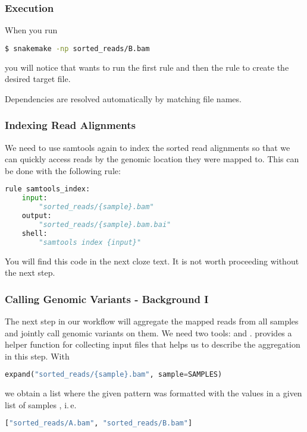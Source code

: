 \begin{frame}[fragile]
  \frametitle{Execution}
  When you run 
  \begin{lstlisting}[language=Bash, style=Shell]
$ snakemake -np sorted_reads/B.bam
  \end{lstlisting}
  you will notice that \Snakemake{} wants to run the first rule  and then the rule  to create the desired target file.
  \begin{docs}
  	Dependencies are resolved automatically by matching file names.
  \end{docs}
\end{frame}

\begin{frame}[fragile]
  \frametitle{Indexing Read Alignments}
  We need to use samtools again to index the sorted read alignments so that we can quickly access reads by the genomic location they were mapped to. This can be done with the following rule:
  \begin{lstlisting}[language=Python,style=Python]
rule samtools_index:
    input:
        "sorted_reads/{sample}.bam"
    output:
        "sorted_reads/{sample}.bam.bai"
    shell:
        "samtools index {input}"
  \end{lstlisting}
  \begin{hint}[Note]
  	You will find this code in the next cloze text. It is not worth proceeding without the next step.
  \end{hint}
\end{frame}

\begin{frame}[fragile]
 \frametitle{Calling Genomic Variants - Background I}
 The next step in our workflow will aggregate the mapped reads from all samples and jointly call genomic variants on them. We need two tools:  and . \newline \pause
 \Snakemake{} provides a helper function for collecting input files that helps us to describe the aggregation in this step. With
 \begin{lstlisting}[language=Python,style=Python]
expand("sorted_reads/{sample}.bam", sample=SAMPLES)
 \end{lstlisting}
 we obtain a list where the given pattern  was formatted with the values in a given list of samples , i.\,e.
 \begin{lstlisting}[language=Python,style=Python]
["sorted_reads/A.bam", "sorted_reads/B.bam"]
 \end{lstlisting}
\end{frame}

